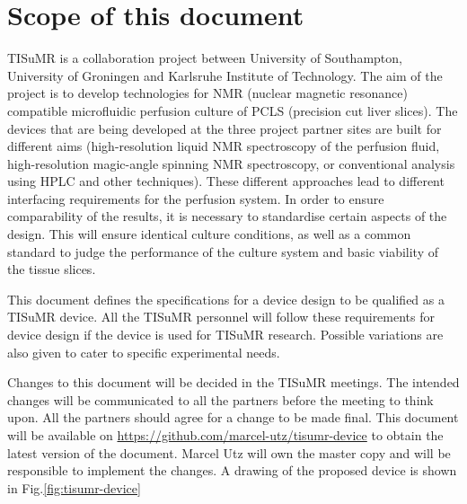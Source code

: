 \documentclass{EU-report}
\begin{document}
\section{Scope of this document}
TISuMR is a collaboration project between University of Southampton, University
of Groningen and Karlsruhe Institute of Technology. The aim of the project is to
develop technologies for NMR (nuclear magnetic resonance) compatible
microfluidic perfusion culture of PCLS (precision cut liver slices).
The devices that are being developed at the three project partner sites
are built for different aims (high-resolution liquid NMR spectroscopy of the
perfusion fluid, high-resolution magic-angle spinning NMR spectroscopy,
or conventional analysis using HPLC and other techniques). These different
approaches lead to different interfacing requirements for the perfusion system.
In order to ensure comparability of the results, it is necessary to standardise
certain aspects of the design. This will ensure identical culture conditions,
as well as a common standard to judge the performance of the culture
system and basic viability of the tissue slices.

This document defines the specifications for a device design to be qualified as
a TISuMR device. All the TISuMR personnel will follow these requirements for
device design if the device is used for TISuMR research. Possible variations are
also given to cater to specific experimental needs.

Changes to this document will be decided in the TISuMR meetings. The intended
changes will be communicated to all the partners before the meeting to think
upon. All the partners should agree for a change to be made final. This document
will be available on
\url{https://github.com/marcel-utz/tisumr-device} to obtain the latest version
of the document. Marcel Utz will own the master copy and will be responsible to
implement the changes. A drawing of the proposed device is shown in
Fig.\ref{fig:tisumr-device}
\end{document}
